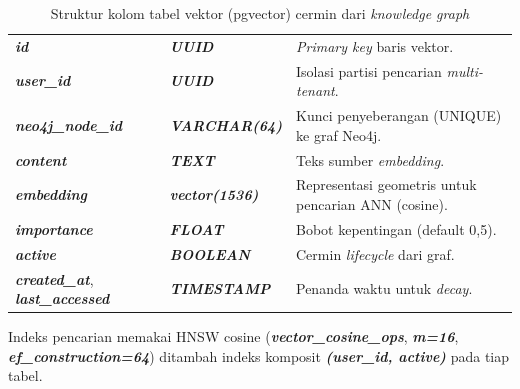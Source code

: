 \begingroup\footnotesize
\renewcommand{\arraystretch}{1.2}
\begin{table}[!htbp]
\centering
\caption{Struktur kolom tabel vektor (pgvector) cermin dari \textit{knowledge graph}}
\begin{tabularx}{\textwidth}{|>{\raggedright\arraybackslash}p{3.4cm}|>{\raggedright\arraybackslash}p{3.2cm}|>{\raggedright\arraybackslash}X|}
\hline
\rowcolor{tableheadgray}
\multicolumn{1}{c}{\textbf{Kolom}} & \multicolumn{1}{c}{\textbf{Tipe}} & \multicolumn{1}{c}{\textbf{Fungsi}}\\
\hline
\textbf{\textit{id}} & \textbf{\textit{UUID}} & \textit{Primary key} baris vektor.\\
\hline
\textbf{\textit{user\_id}} & \textbf{\textit{UUID}} & Isolasi partisi pencarian \textit{multi-tenant}.\\
\hline
\textbf{\textit{neo4j\_node\_id}} & \textbf{\textit{VARCHAR(64)}} & Kunci penyeberangan (UNIQUE) ke graf Neo4j.\\
\hline
\textbf{\textit{content}} & \textbf{\textit{TEXT}} & Teks sumber \textit{embedding}.\\
\hline
\textbf{\textit{embedding}} & \textbf{\textit{vector(1536)}} & Representasi geometris untuk pencarian ANN (cosine).\\
\hline
\textbf{\textit{importance}} & \textbf{\textit{FLOAT}} & Bobot kepentingan (default 0,5).\\
\hline
\textbf{\textit{active}} & \textbf{\textit{BOOLEAN}} & Cermin \textit{lifecycle} dari graf.\\
\hline
\textbf{\textit{created\_at}}, \textbf{\textit{last\_accessed}} & \textbf{\textit{TIMESTAMP}} & Penanda waktu untuk \textit{decay}.\\
\hline
\end{tabularx}
\end{table}
\endgroup

Indeks pencarian memakai HNSW cosine (\textbf{\textit{vector\_cosine\_ops}}, \textbf{\textit{m=16}}, \textbf{\textit{ef\_construction=64}}) ditambah indeks komposit \textbf{\textit{(user\_id, active)}} pada tiap tabel.


